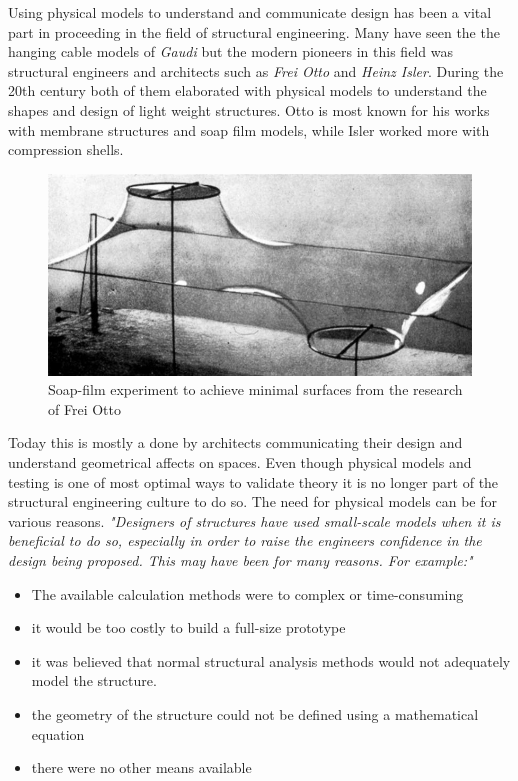 Using physical models to understand and communicate design has been a vital part in proceeding in the field of structural engineering. Many have seen the the hanging cable models of \textit{Gaudi} but the modern pioneers in this field was structural engineers and architects such as \textit{Frei Otto} and \textit{Heinz Isler}. During the 20th century both of them elaborated with physical models to understand the shapes and design of light weight structures. Otto is most known for his works with membrane structures and soap film models, while Isler worked more with compression shells.\cite{ref:Isler}
\begin{figure}[H]
\centering
\includegraphics[width=0.6\linewidth ]{figure/Theory/Soap.jpg}
\caption{Soap-film experiment to achieve minimal surfaces from the research of Frei Otto }
\end{figure}

Today this is mostly a done by architects communicating their design and understand geometrical affects on spaces. Even though physical models and testing is one of most optimal ways to validate theory it is no longer part of the structural engineering culture to do so. The need for physical models can be for various reasons.\textit{ 
"Designers of structures have used small-scale models when it is beneficial to do so, especially in order to raise the engineers confidence in the design being proposed. This may have been for many reasons. For example:"}  \cite{ref:ShellOpt}

\begin{itemize}
\item The available calculation methods were to complex or time-consuming
\item it would be too costly to build a full-size prototype
\item it was believed that normal structural analysis methods would not adequately model the structure.
\item the geometry of the structure could not be defined using a mathematical equation
\item there were no other means available
\end{itemize}





